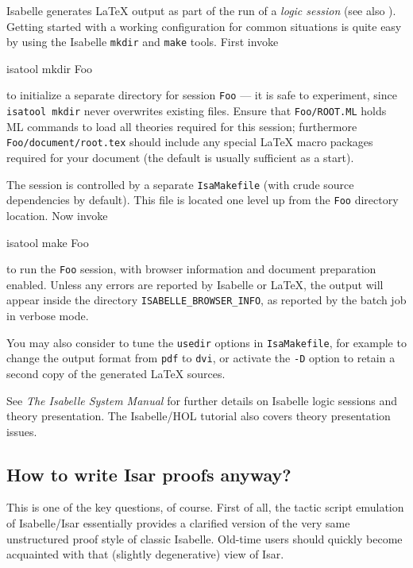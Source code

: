 Isabelle generates {\LaTeX} output as part of the run of a \emph{logic
  session} (see also \cite{isabelle-sys}).  Getting started with a working
configuration for common situations is quite easy by using the Isabelle
\texttt{mkdir} and \texttt{make} tools.  First invoke
\begin{ttbox}
  isatool mkdir Foo
\end{ttbox}
to initialize a separate directory for session \texttt{Foo} --- it is safe to
experiment, since \texttt{isatool mkdir} never overwrites existing files.
Ensure that \texttt{Foo/ROOT.ML} holds ML commands to load all theories
required for this session; furthermore \texttt{Foo/document/root.tex} should
include any special {\LaTeX} macro packages required for your document (the
default is usually sufficient as a start).

The session is controlled by a separate \texttt{IsaMakefile} (with crude
source dependencies by default).  This file is located one level up from the
\texttt{Foo} directory location.  Now invoke
\begin{ttbox}
  isatool make Foo
\end{ttbox}
to run the \texttt{Foo} session, with browser information and document
preparation enabled.  Unless any errors are reported by Isabelle or {\LaTeX},
the output will appear inside the directory \texttt{ISABELLE_BROWSER_INFO}, as
reported by the batch job in verbose mode.

\medskip

You may also consider to tune the \texttt{usedir} options in
\texttt{IsaMakefile}, for example to change the output format from
\texttt{pdf} to \texttt{dvi}, or activate the \texttt{-D} option to retain a
second copy of the generated {\LaTeX} sources.

\medskip

See \emph{The Isabelle System Manual} \cite{isabelle-sys} for further details
on Isabelle logic sessions and theory presentation.  The Isabelle/HOL tutorial
\cite{isabelle-hol-book} also covers theory presentation issues.


\subsection{How to write Isar proofs anyway?}\label{sec:isar-howto}

This is one of the key questions, of course.  First of all, the tactic script
emulation of Isabelle/Isar essentially provides a clarified version of the
very same unstructured proof style of classic Isabelle.  Old-time users should
quickly become acquainted with that (slightly degenerative) view of Isar.

